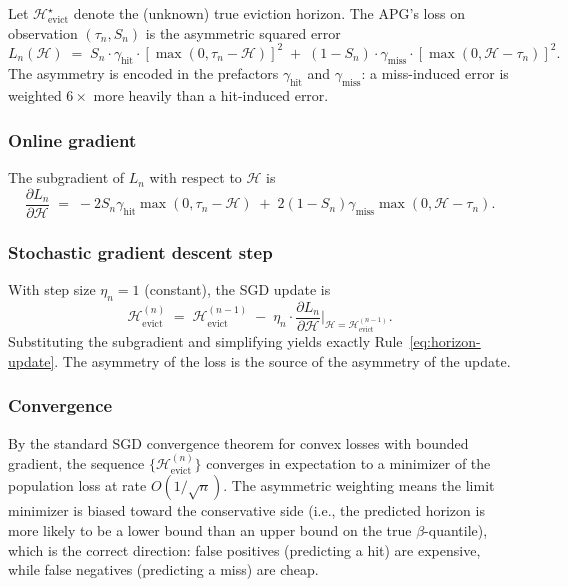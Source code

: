 Let $\mathcal{H}_{\text{evict}}^{\star}$ denote the (unknown)
true eviction horizon. The APG's loss on observation
$(\tau_n, S_n)$ is the asymmetric squared error
\[
  L_n(\mathcal{H}) \;=\;
  S_n \cdot \gamma_{\text{hit}} \cdot [\max(0, \tau_n - \mathcal{H})]^2
  \;+\;
  (1 - S_n) \cdot \gamma_{\text{miss}} \cdot [\max(0, \mathcal{H} - \tau_n)]^2.
\]
The asymmetry is encoded in the prefactors
$\gamma_{\text{hit}}$ and $\gamma_{\text{miss}}$: a miss-induced
error is weighted $6\times$ more heavily than a hit-induced
error.

\subsubsection{Online gradient}

The subgradient of $L_n$ with respect to $\mathcal{H}$ is
\[
  \frac{\partial L_n}{\partial \mathcal{H}} \;=\;
  -2 S_n \gamma_{\text{hit}} \max(0, \tau_n - \mathcal{H})
  \;+\;
  2 (1 - S_n) \gamma_{\text{miss}} \max(0, \mathcal{H} - \tau_n).
\]

\subsubsection{Stochastic gradient descent step}

With step size $\eta_n = 1$ (constant), the SGD update is
\[
  \mathcal{H}_{\text{evict}}^{(n)}
  \;=\;
  \mathcal{H}_{\text{evict}}^{(n-1)}
  \;-\; \eta_n \cdot \frac{\partial L_n}{\partial \mathcal{H}} \bigg|_{\mathcal{H} = \mathcal{H}_{\text{evict}}^{(n-1)}}.
\]
Substituting the subgradient and simplifying yields exactly
Rule~\eqref{eq:horizon-update}. The asymmetry of the loss is
the source of the asymmetry of the update.

\subsubsection{Convergence}

By the standard SGD convergence theorem for convex losses with
bounded gradient, the sequence
$\{\mathcal{H}_{\text{evict}}^{(n)}\}$ converges in
expectation to a minimizer of the population loss at rate
$O(1/\sqrt{n})$. The asymmetric weighting means the limit
minimizer is biased toward the conservative side (i.e., the
predicted horizon is more likely to be a lower bound than an
upper bound on the true $\beta$-quantile), which is the
correct direction: false positives (predicting a hit) are
expensive, while false negatives (predicting a miss) are cheap.

